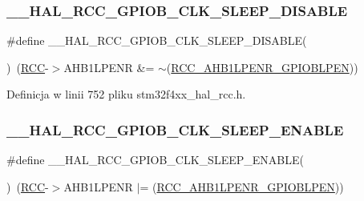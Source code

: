 \subsubsection{\texorpdfstring{\+\_\+\+\_\+\+H\+A\+L\+\_\+\+R\+C\+C\+\_\+\+G\+P\+I\+O\+B\+\_\+\+C\+L\+K\+\_\+\+S\+L\+E\+E\+P\+\_\+\+D\+I\+S\+A\+B\+LE}{\_\_HAL\_RCC\_GPIOB\_CLK\_SLEEP\_DISABLE}}
{\footnotesize\ttfamily \#define \+\_\+\+\_\+\+H\+A\+L\+\_\+\+R\+C\+C\+\_\+\+G\+P\+I\+O\+B\+\_\+\+C\+L\+K\+\_\+\+S\+L\+E\+E\+P\+\_\+\+D\+I\+S\+A\+B\+LE(\begin{DoxyParamCaption}{ }\end{DoxyParamCaption})~(\hyperlink{group___peripheral__declaration_ga74944438a086975793d26ae48d5882d4}{R\+CC}-\/$>$A\+H\+B1\+L\+P\+E\+NR \&= $\sim$(\hyperlink{group___peripheral___registers___bits___definition_ga55f6ff35a37c4b9106c9e8aa18ab4545}{R\+C\+C\+\_\+\+A\+H\+B1\+L\+P\+E\+N\+R\+\_\+\+G\+P\+I\+O\+B\+L\+P\+EN}))}



Definicja w linii 752 pliku stm32f4xx\+\_\+hal\+\_\+rcc.\+h.

\mbox{\label{group___r_c_c___a_h_b1___low_power___enable___disable_ga0e718efc965ab07752cd865c3f33551a}} 
\subsubsection{\texorpdfstring{\+\_\+\+\_\+\+H\+A\+L\+\_\+\+R\+C\+C\+\_\+\+G\+P\+I\+O\+B\+\_\+\+C\+L\+K\+\_\+\+S\+L\+E\+E\+P\+\_\+\+E\+N\+A\+B\+LE}{\_\_HAL\_RCC\_GPIOB\_CLK\_SLEEP\_ENABLE}}
{\footnotesize\ttfamily \#define \+\_\+\+\_\+\+H\+A\+L\+\_\+\+R\+C\+C\+\_\+\+G\+P\+I\+O\+B\+\_\+\+C\+L\+K\+\_\+\+S\+L\+E\+E\+P\+\_\+\+E\+N\+A\+B\+LE(\begin{DoxyParamCaption}{ }\end{DoxyParamCaption})~(\hyperlink{group___peripheral__declaration_ga74944438a086975793d26ae48d5882d4}{R\+CC}-\/$>$A\+H\+B1\+L\+P\+E\+NR $\vert$= (\hyperlink{group___peripheral___registers___bits___definition_ga55f6ff35a37c4b9106c9e8aa18ab4545}{R\+C\+C\+\_\+\+A\+H\+B1\+L\+P\+E\+N\+R\+\_\+\+G\+P\+I\+O\+B\+L\+P\+EN}))}



